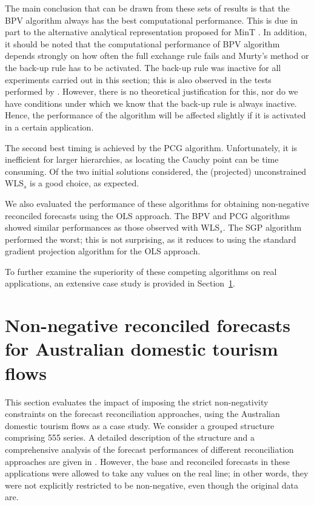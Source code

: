 \documentclass[twocolumn]{svjour3}
\begin{document}
The main conclusion that can be drawn from these sets of results is that the BPV algorithm always has the best computational performance. This is due in part to the alternative analytical representation proposed for MinT \citep{Wick2018}. In addition, it should be noted that the computational performance of BPV algorithm depends strongly on how often the full exchange rule fails and Murty's method or the back-up rule has to be activated. The back-up rule was inactive for all experiments carried out in this section; this is also observed in the tests performed by \citet{Kim2011}. However, there is no theoretical justification for this, nor do we have conditions under which we know that the back-up rule is always inactive. Hence, the performance of the algorithm will be affected slightly if it is activated in a certain application.

The second best timing is achieved by the PCG algorithm. Unfortunately, it is inefficient for larger hierarchies, as locating the Cauchy point can be time consuming. Of the two initial solutions considered, the (projected) unconstrained WLS$_s$ is a good choice, as expected.

We also evaluated the performance of these algorithms for obtaining non-negative reconciled forecasts using the OLS approach. The BPV and PCG algorithms showed similar performances as those  observed with WLS$_s$. The SGP algorithm performed the worst; this is not surprising, as it reduces to using the standard gradient projection algorithm for the OLS approach.

To further examine the superiority of these competing algorithms on real applications, an extensive case study is provided in Section~\ref{sec:AUSNN}.

\section{Non-negative reconciled forecasts for Australian domestic tourism flows}
\label{sec:AUSNN}

This section evaluates the impact of imposing the strict non-negativity constraints on the forecast reconciliation approaches, using the Australian domestic tourism flows as a case study. We consider a grouped structure comprising 555 series. A detailed description of the structure and a comprehensive analysis of the forecast performances of different reconciliation approaches are given in \citet{Wick2018}. However, the base and reconciled forecasts in these applications were allowed to take any values on the real line; in other words, they were not explicitly restricted to be non-negative, even though the original data are.
\end{document}
